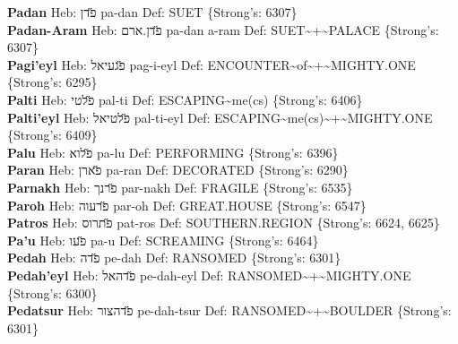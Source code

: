 {\textbf{Padan} Heb: {\large\H פדן} pa-dan Def: SUET \{Strong's: 6307\}\hfill{}\\

\textbf{Padan-Aram} Heb: {\large\H פדן.ארם} pa-dan a-ram Def: SUET\textasciitilde{}+\textasciitilde{}PALACE \{Strong's: 6307\}\hfill{}\\

\textbf{Pagi'eyl} Heb: {\large\H פגעיאל} pag-i-eyl Def: ENCOUNTER\textasciitilde{}of\textasciitilde{}+\textasciitilde{}MIGHTY.ONE \{Strong's: 6295\}\hfill{}\\

\textbf{Palti} Heb: {\large\H פלטי} pal-ti Def: ESCAPING\textasciitilde{}me(cs) \{Strong's: 6406\}\hfill{}\\

\textbf{Palti'eyl} Heb: {\large\H פלטיאל} pal-ti-eyl Def: ESCAPING\textasciitilde{}me(cs)\textasciitilde{}+\textasciitilde{}MIGHTY.ONE \{Strong's: 6409\}\hfill{}\\

\textbf{Palu} Heb: {\large\H פלוא} pa-lu Def: PERFORMING \{Strong's: 6396\}\hfill{}\\

\textbf{Paran} Heb: {\large\H פארן} pa-ran Def: DECORATED \{Strong's: 6290\}\hfill{}\\

\textbf{Parnakh} Heb: {\large\H פרנך} par-nakh Def: FRAGILE \{Strong's: 6535\}\hfill{}\\

\textbf{Paroh} Heb: {\large\H פרעוה} par-oh Def: GREAT.HOUSE \{Strong's: 6547\}\hfill{}\\

\textbf{Patros} Heb: {\large\H פתרוס} pat-ros Def: SOUTHERN.REGION \{Strong's: 6624, 6625\}\hfill{}\\

\textbf{Pa'u} Heb: {\large\H פעו} pa-u Def: SCREAMING \{Strong's: 6464\}\hfill{}\\

\textbf{Pedah} Heb: {\large\H פדה} pe-dah Def: RANSOMED \{Strong's: 6301\}\hfill{}\\

\textbf{Pedah'eyl} Heb: {\large\H פדהאל} pe-dah-eyl Def: RANSOMED\textasciitilde{}+\textasciitilde{}MIGHTY.ONE \{Strong's: 6300\}\hfill{}\\

\textbf{Pedatsur} Heb: {\large\H פדהצור} pe-dah-tsur Def: RANSOMED\textasciitilde{}+\textasciitilde{}BOULDER \{Strong's: 6301\}\hfill{}\\

}
